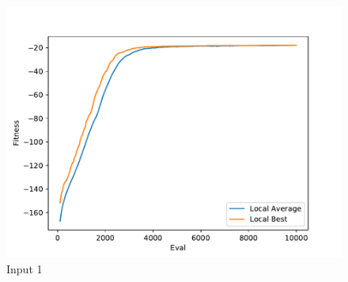 \documentclass{standalone}
\begin{document}
\begin{figure}[!htb]
	\caption{Input 1}
	\label{fig:graph_1066}
	\includegraphics[width=\textwidth]{../graphs/graphs/1066.pdf}
\end{figure}
\end{document}

